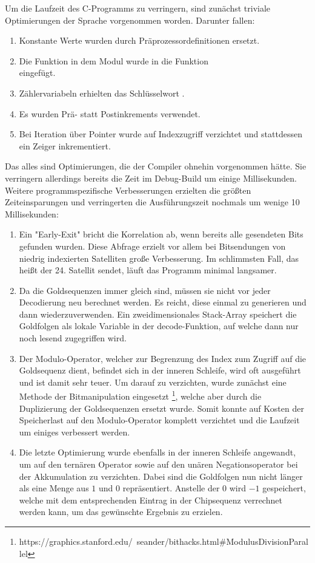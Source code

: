 Um die Laufzeit des C-Programms zu verringern, sind zunächst triviale Optimierungen der Sprache vorgenommen worden. Darunter fallen:
\begin{enumerate}
	\item Konstante Werte wurden durch Präprozessordefinitionen ersetzt.
	\item Die Funktion in dem Modul  wurde in die Funktion \\  eingefügt.
	\item Zählervariabeln erhielten das Schlüsselwort .
	\item Es wurden Prä- statt Postinkrements verwendet.
	\item Bei Iteration über Pointer wurde auf Indexzugriff verzichtet und stattdessen ein Zeiger inkrementiert.
\end{enumerate}
Das alles sind Optimierungen, die der Compiler ohnehin vorgenommen hätte. Sie verringern allerdings bereits die Zeit im Debug-Build um einige Millisekunden. 
Weitere programmspezifische Verbesserungen erzielten die größten Zeiteinsparungen und verringerten die Ausführungszeit nochmals um wenige 10 Millisekunden:
\begin{enumerate}
	\item Ein "Early-Exit" bricht die Korrelation ab, wenn bereits alle gesendeten Bits gefunden wurden. Diese Abfrage erzielt vor allem bei Bitsendungen von niedrig indexierten Satelliten große Verbesserung. Im schlimmsten Fall, das heißt der 24. Satellit sendet, läuft das Programm minimal langsamer. 
	\item Da die Goldsequenzen immer gleich sind, müssen sie nicht vor jeder Decodierung neu berechnet werden. Es reicht, diese einmal zu generieren und dann wiederzuverwenden. Ein zweidimensionales Stack-Array speichert die Goldfolgen als lokale Variable in der decode-Funktion, auf welche dann nur noch lesend zugegriffen wird.
	\item Der Modulo-Operator, welcher zur Begrenzung des Index zum Zugriff auf die Goldsequenz dient, befindet sich in der inneren Schleife, wird oft ausgeführt und ist damit sehr teuer. Um darauf zu verzichten, wurde zunächst eine Methode der Bitmanipulation eingesetzt \footnote{https://graphics.stanford.edu/~seander/bithacks.html\#ModulusDivisionParallel}, welche aber durch die Duplizierung der Goldsequenzen ersetzt wurde. Somit konnte auf Kosten der Speicherlast auf den Modulo-Operator komplett verzichtet und die Laufzeit um einiges verbessert werden.
	\item Die letzte Optimierung wurde ebenfalls in der inneren Schleife angewandt, um auf den ternären Operator sowie auf den unären Negationsoperator bei der Akkumulation zu verzichten. Dabei sind die Goldfolgen nun nicht länger als eine Menge aus $ 1 $ und $ 0 $ repräsentiert. Anstelle der $ 0 $ wird $ -1 $ gespeichert, welche mit dem entsprechenden Eintrag in der Chipsequenz verrechnet werden kann, um das gewünschte Ergebnis zu erzielen.
\end{enumerate}